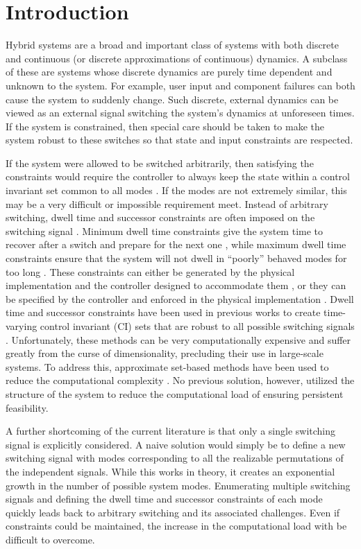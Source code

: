 \section{Introduction}
Hybrid systems are a broad and important class of systems with both discrete and continuous (or discrete approximations of continuous) dynamics. A subclass of these are systems whose discrete dynamics are purely time dependent and unknown to the system. For example, user input and component failures can both cause the system to suddenly change. Such discrete, external dynamics can be viewed as an external signal switching the system's dynamics at unforeseen times. If the system is constrained, then special care should be taken to make the system robust to these switches so that state and input constraints are respected. 

If the system were allowed to be switched arbitrarily, then satisfying the constraints would require the controller to always keep the state within a control invariant set common to all modes \cite{Liberzon1999}. If the modes are not extremely similar, this may be a very difficult or impossible requirement meet. Instead of arbitrary switching, dwell time and successor constraints are often imposed on the switching signal \cite{Liberzon1999,Morse1999}. Minimum dwell time constraints give the system time to recover after a switch and prepare for the next one \cite{Danielson2019}, while maximum dwell time constraints ensure that the system will not dwell in ``poorly'' behaved modes for too long \cite{Hall2022}. These constraints can either be generated by the physical implementation and the controller designed to accommodate them \cite{Danielson2019}, or they can be specified by the controller and enforced in the physical implementation \cite{Zhang2016}. Dwell time and successor constraints have been used in previous works to create time-varying control invariant (CI) sets that are robust to all possible switching signals \cite{Danielson2019}. Unfortunately, these methods can be very computationally expensive and suffer greatly from the curse of dimensionality, precluding their use in large-scale systems. To address this, approximate set-based methods have been used to reduce the computational complexity \cite{Santis2004}. No previous solution, however, utilized the structure of the system to reduce the computational load of ensuring persistent feasibility. 

A further shortcoming of the current literature is that only a single switching signal is explicitly considered. A naive solution would simply be to define a new switching signal with modes corresponding to all the realizable permutations of the independent signals. While this works in theory, it creates an exponential growth in the number of possible system modes. Enumerating multiple switching signals and defining the dwell time and successor constraints of each mode quickly leads back to arbitrary switching and its associated challenges. Even if constraints could be maintained, the increase in the computational load with be difficult to overcome. 

